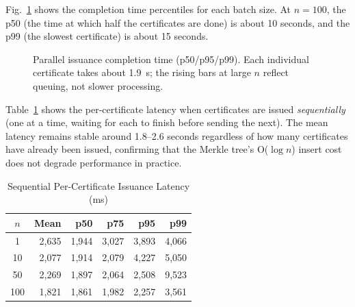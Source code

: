 \documentclass[conference]{IEEEtran}
\begin{document}
Fig.~\ref{fig:issuance_perc} shows the completion time percentiles for each batch size. At $n = 100$, the p50 (the time at which half the certificates are done) is about 10 seconds, and the p99 (the slowest certificate) is about 15 seconds.

\begin{figure}[t]
\centering
{}
\caption{Parallel issuance completion time (p50/p95/p99). Each individual certificate takes about 1.9~s; the rising bars at large $n$ reflect queuing, not slower processing.}
\label{fig:issuance_perc}
\end{figure}

Table~\ref{tab:seq_issuance} shows the per-certificate latency when certificates are issued \emph{sequentially} (one at a time, waiting for each to finish before sending the next). The mean latency remains stable around 1.8--2.6 seconds regardless of how many certificates have already been issued, confirming that the Merkle tree's O($\log n$) insert cost does not degrade performance in practice.

\begin{table}[t]
\caption{Sequential Per-Certificate Issuance Latency (ms)}
\label{tab:seq_issuance}
\centering\small\renewcommand{\arraystretch}{1.1}
\begin{tabular}{@{}crrrrr@{}}
\toprule
\textbf{$n$} & \textbf{Mean} & \textbf{p50} & \textbf{p75} & \textbf{p95} & \textbf{p99} \\
\midrule
1   & 2{,}635 & 1{,}944 & 3{,}027 & 3{,}893 & 4{,}066 \\
10  & 2{,}077 & 1{,}914 & 2{,}079 & 4{,}227 & 5{,}050 \\
50  & 2{,}269 & 1{,}897 & 2{,}064 & 2{,}508 & 9{,}523 \\
100 & 1{,}821 & 1{,}861 & 1{,}982 & 2{,}257 & 3{,}561 \\
\bottomrule
\end{tabular}
\end{table}
\end{document}
